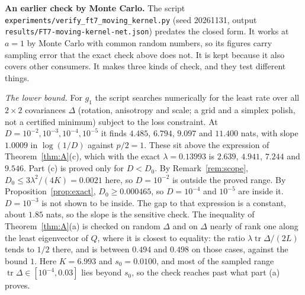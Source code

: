 \documentclass[11pt,onecolumn]{IEEEtran}
\newcommand{\tr}{\operatorname{tr}}
\begin{document}
\textbf{An earlier check by Monte Carlo.} The script
\texttt{experiments/verify\_ft7\_moving\_kernel.py} (seed 20261131, output
\texttt{results/FT7-moving-kernel-net.json}) predates the closed form. It works at $a=1$ by Monte Carlo with common random numbers, so its figures carry
sampling error that the exact check above does not. It is kept because it also covers
other consumers. It makes three kinds of check, and they test different things.

\emph{The lower bound.} For $g_1$ the script searches numerically for the least rate
over all $2\times2$ covariances $\Delta$ (rotation, anisotropy and scale; a grid and a
simplex polish, not a certified minimum) subject to the loss constraint. At
$D=10^{-2},10^{-3},10^{-4},10^{-5}$ it finds $4.485$, $6.794$, $9.097$ and
$11.400$ nats, with slope $1.0009$ in $\log(1/D)$ against $p/2=1$. These sit above the
expression of Theorem~\ref{thm:A}(c), which with the exact $\lambda=0.13993$ is $2.639$,
$4.941$, $7.244$ and $9.546$. Part (c) is proved only for $D<D_0$. By
Remark~\ref{rem:scope}, $D_0\le3\lambda^2/(4K)=0.0021$ here, so $D=10^{-2}$ is outside
the proved range. By Proposition~\ref{prop:exact}, $D_0\ge0.000465$, so $D=10^{-4}$ and $10^{-5}$ are
inside it. $D=10^{-3}$ is not shown to be inside. The
gap to that expression is a constant, about $1.85$ nats, so the slope is the sensitive
check. The inequality of Theorem~\ref{thm:A}(a) is checked on random $\Delta$ and on
$\Delta$ nearly of rank one along the least eigenvector of $Q$, where it is closest to
equality: the ratio $\lambda\tr\Delta/(2L)$ tends to $1/2$ there, and is between $0.494$
and $0.498$ on those cases, against the bound $1$. Here $K=6.993$ and $s_0=0.0100$, and
most of the sampled range $\tr\Delta\in[10^{-4},0.03]$ lies beyond $s_0$, so the check
reaches past what part (a) proves.
\end{document}
